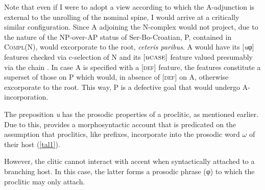 \documentclass[output=paper]{langsci/langscibook}
\begin{document}
Note that even if I were to adopt a view according to which the
A-ad\-jun\-ction is external to the unrolling of the nominal spine, I would
arrive at a critically similar configuration. Since A
adjoining the N-complex would not project, due to the nature of the NP-over-AP
status of Ser-Bo-Croatian,  P,
contained in \textsc{Compl}(N), would excorporate to the
root, \emph{ceteris paribus}. A would have its [\emph{u}φ]
features checked via c-selection of N and its $[u\textsc{case}]$ feature valued
presumably via the chain . In case A is
specified with a \textsc{[def]} feature, the features constitute a superset of
those on P which would, in absence of \textsc{[def]} on
A, otherwise excorporate to the root. This way, P is a
defective goal that would undergo A-incorporation.

The preposition \emph{u} has the prosodic properties of a proclitic, as
mentioned earlier. Due to this, \cite{Talic:2013,Talic:2015} provides a
morphosyntactic account that is predicated on the assumption that proclitics,
like prefixes, incorporate into the prosodic word $\omega$ of their host
(\ref{tal1}).

\begin{exe}
	\ex
	 \hfill \citep[ex. 7]{Talic:2015}

\label{tal1}

\end{exe}

However, the clitic cannot interact with accent when syntactically attached  to
a  branching host. In this case, the latter forms a prosodic phrase (φ) to
which the proclitic may only attach.
\end{document}
